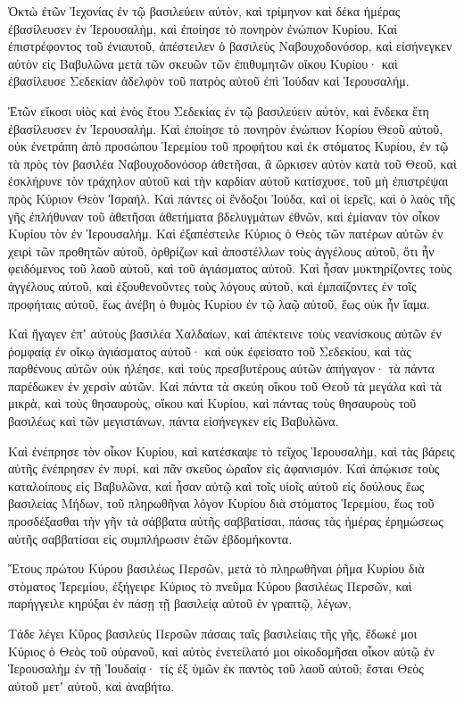 {\par }{\PP {}Ὀκτὼ ἐτῶν Ἰεχονίας ἐν τῷ βασιλεύειν αὐτὸν, καὶ τρίμηνον καὶ δέκα ἡμέρας ἐβασίλευσεν ἐν Ἱερουσαλὴμ, καὶ ἐποίησε τὸ πονηρὸν ἐνώπιον Κυρίου.
Καὶ ἐπιστρέφοντος τοῦ ἐνιαυτοῦ, ἀπέστειλεν ὁ βασιλεὺς Ναβουχοδονόσορ, καὶ εἰσήνεγκεν αὐτὸν εἰς Βαβυλῶνα μετὰ τῶν σκευῶν τῶν ἐπιθυμητῶν οἴκου Κυρίου· καὶ ἐβασίλευσε Σεδεκίαν ἀδελφὸν τοῦ πατρὸς αὐτοῦ ἐπὶ Ἰούδαν καὶ Ἱερουσαλήμ.
\par }{\PP {}Ἐτῶν εἴκοσι υἱὸς καὶ ἑνὸς ἔτου Σεδεκίας ἐν τῷ βασιλεύειν αὐτὸν, καὶ ἕνδεκα ἔτη ἐβασίλευσεν ἐν Ἱερουσαλήμ.
Καὶ ἐποίησε τὸ πονηρὸν ἐνώπιον Κορίου Θεοῦ αὐτοῦ, οὐκ ἐνετράπη ἀπὸ προσώπου Ἱερεμίου τοῦ προφήτου καὶ ἐκ στόματος Κυρίου,
ἐν τῷ τὰ πρὸς τὸν βασιλέα Ναβουχοδονόσορ ἀθετῆσαι, ἃ ὥρκισεν αὐτὸν κατὰ τοῦ Θεοῦ, καὶ ἐσκλήρυνε τὸν τράχηλον αὐτοῦ καὶ τὴν καρδίαν αὐτοῦ κατίσχυσε, τοῦ μὴ ἐπιστρέψαι πρὸς Κύριον Θεὸν Ἰσραήλ.
Καὶ πάντες οἱ ἔνδοξοι Ἰούδα, καὶ οἱ ἱερεῖς, καὶ ὁ λαὸς τῆς γῆς ἐπλήθυναν τοῦ ἀθετῆσαι ἀθετήματα βδελυγμάτων ἐθνῶν, καὶ ἐμίαναν τὸν οἶκον Κυρίου τὸν ἐν Ἱερουσαλήμ.
Καὶ ἐξαπέστειλε Κύριος ὁ Θεὸς τῶν πατέρων αὐτῶν ἐν χειρὶ τῶν προθητῶν αὐτοῦ, ὀρθρίζων καὶ ἀποστέλλων τοὺς ἀγγέλους αὐτοῦ, ὅτι ἦν φειδόμενος τοῦ λαοῦ αὐτοῦ, καὶ τοῦ ἁγιάσματος αὐτοῦ.
Καὶ ἦσαν μυκτηρίζοντες τοὺς ἀγγέλους αὐτοῦ, καὶ ἐξουθενοῦντες τοὺς λόγους αὐτοῦ, καὶ ἐμπαίζοντες ἐν τοῖς προφήταις αὐτοῦ, ἕως ἀνέβη ὁ θυμὸς Κυρίου ἐν τῷ λαῷ αὐτοῦ, ἕως οὐκ ἦν ἴαμα.
\par }{\PP {}Καὶ ἤγαγεν ἐπʼ αὐτοὺς βασιλέα Χαλδαίων, καὶ ἀπέκτεινε τοὺς νεανίσκους αὐτῶν ἐν ῥομφαίᾳ ἐν οἴκῳ ἁγιάσματος αὐτοῦ· καὶ οὐκ ἐφείσατο τοῦ Σεδεκίου, καὶ τὰς παρθένους αὐτῶν οὐκ ἠλέησε, καὶ τοὺς πρεσβυτέρους αὐτῶν ἀπήγαγον· τὰ πάντα παρέδωκεν ἐν χερσὶν αὐτῶν.
Καὶ πάντα τὰ σκεύη οἴκου τοῦ Θεοῦ τὰ μεγάλα καὶ τὰ μικρὰ, καὶ τοὺς θησαυροὺς, οἴκου καὶ Κυρίου, καὶ πάντας τοὺς θησαυροὺς τοῦ βασιλέως καὶ τῶν μεγιστάνων, πάντα εἰσήνεγκεν εἰς Βαβυλῶνα.
\par }{\PP {}Καὶ ἐνέπρησε τὸν οἶκον Κυρίου, καὶ κατέσκαψε τὸ τεῖχος Ἱερουσαλὴμ, καὶ τὰς βάρεις αὐτῆς ἐνέπρησεν ἐν πυρί, καὶ πᾶν σκεῦος ὡραῖον εἰς ἀφανισμόν.
Καὶ ἀπῴκισε τοὺς καταλοίπους εἰς Βαβυλῶνα, καὶ ἦσαν αὐτῷ καὶ τοῖς υἱοῖς αὐτοῦ εἰς δούλους ἕως βασιλείας Μήδων,
τοῦ πληρωθῆναι λόγον Κυρίου διὰ στόματος Ἱερεμίου, ἕως τοῦ προσδέξασθαι τὴν γῆν τὰ σάββατα αὐτῆς σαββατίσαι, πάσας τὰς ἡμέρας ἐρημώσεως αὐτῆς σαββατίσαι εἰς συμπλήρωσιν ἐτῶν ἑβδομήκοντα.
\par }{\PP {}Ἔτους πρώτου Κύρου βασιλέως Περσῶν, μετὰ τὸ πληρωθῆναι ῥῆμα Κυρίου διὰ στὸματος Ἱερεμίου, ἐξήγειρε Κύριος τὸ πνεῦμα Κύρου βασιλέως Περσῶν, καὶ παρήγγειλε κηρύξαι ἐν πάσῃ τῇ βασιλείᾳ αὐτοῦ ἑν γραπτῷ, λέγων,
\par }{\PP {}Τάδε λέγει Κῦρος βασιλεὺς Περσῶν πάσαις ταῖς βασιλείαις τῆς γῆς, ἔδωκέ μοι Κύριος ὁ Θεὸς τοῦ οὐρανοῦ, καὶ αὐτὸς ἐνετείλατό μοι οἰκοδομῆσαι οἶκον αὐτῷ ἐν Ἱερουσαλὴμ ἐν τῇ Ἰουδαίᾳ· τίς ἐξ ὑμῶν ἐκ παντὸς τοῦ λαοῦ αὐτοῦ; ἔσται Θεὸς αὐτοῦ μετʼ αὐτοῦ, καὶ ἀναβήτω.
\par }